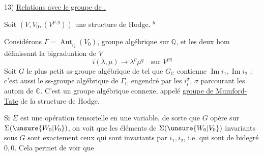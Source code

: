 
13) \uline{Relations avec le groupe de
.}


Soit $(V,V_0,(V^{p,q}))$ une structure de Hodge. $^{b}$


Considérons $\Gamma=\underline{\operatorname{Aut}}_{\mathbb{Q}}(V_0)$,
groupe algébrique
sur $\mathbb{Q}$, et les deux hom
définissant la bigraduation de $V$
\[
 i(\lambda,\mu)\longrightarrow\lambda^p\mu^q\quad\text{sur }V^{pq}
\]
Soit $G$ le plus petit ss-groupe algébrique de \inserted{$\Gamma$}
tel que $G_{\mathbb{C}}$ contienne $\operatorname{Im}i_1,\operatorname{Im}i_2$ ;
 c'est aussi le ss-groupe algébrique de
$\Gamma_{\mathbb{C}}$ engendré par les $i_i^\sigma$, $\sigma$ parcourant
les  autom de $\mathbb{C}$.
C'est un groupe
algébrique connexe, appelé \uline{groupe de Mumford-Tate}
de la structure de Hodge.


Si $\Sigma$ est
une opération tensorielle en une variable,
de sorte que $G$ opère sur $\Sigma(\unsure{W_0|V_0})$,
on voit que les éléments de $\Sigma(\unsure{W_0|V_0})$ invariants
sous $G$ sont exactement ceux qui sont
invariants par  $i_1,i_2$, i.e. qui sont de
bidegré $0,0$. Cela permet de voir que

